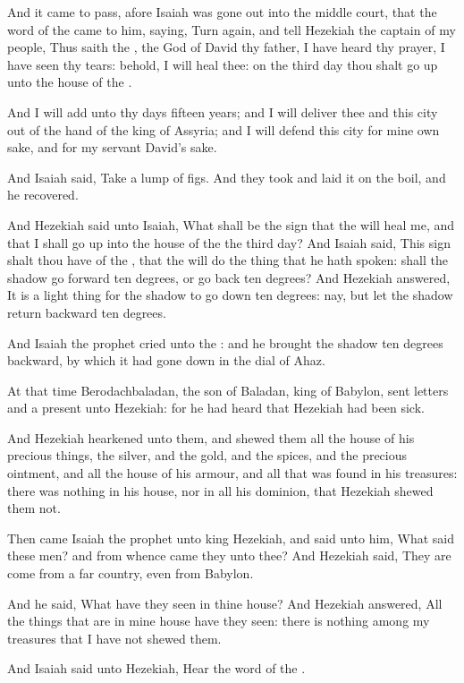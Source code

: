 \Verse And it came to pass, afore Isaiah was gone out into the middle court, that the word of the \LORD came to him, saying, \Verse Turn again, and tell Hezekiah the captain of my people, Thus saith the \LORD, the God of David thy father, I have heard thy prayer, I have seen thy tears: behold, I will heal thee: on the third day thou shalt go up unto the house of the \LORD.

\Verse And I will add unto thy days fifteen years; and I will deliver thee and this city out of the hand of the king of Assyria; and I will defend this city for mine own sake, and for my servant David's sake.

\Verse And Isaiah said, Take a lump of figs. And they took and laid it on the boil, and he recovered.

\Verse And Hezekiah said unto Isaiah, What shall be the sign that the \LORD will heal me, and that I shall go up into the house of the \LORD the third day?  \Verse And Isaiah said, This sign shalt thou have of the \LORD, that the \LORD will do the thing that he hath spoken: shall the shadow go forward ten degrees, or go back ten degrees?  \Verse And Hezekiah answered, It is a light thing for the shadow to go down ten degrees: nay, but let the shadow return backward ten degrees.

\Verse And Isaiah the prophet cried unto the \LORD: and he brought the shadow ten degrees backward, by which it had gone down in the dial of Ahaz.

\Verse At that time Berodachbaladan, the son of Baladan, king of Babylon, sent letters and a present unto Hezekiah: for he had heard that Hezekiah had been sick.

\Verse And Hezekiah hearkened unto them, and shewed them all the house of his precious things, the silver, and the gold, and the spices, and the precious ointment, and all the house of his armour, and all that was found in his treasures: there was nothing in his house, nor in all his dominion, that Hezekiah shewed them not.

\Verse Then came Isaiah the prophet unto king Hezekiah, and said unto him, What said these men? and from whence came they unto thee? And Hezekiah said, They are come from a far country, even from Babylon.

\Verse And he said, What have they seen in thine house? And Hezekiah answered, All the things that are in mine house have they seen: there is nothing among my treasures that I have not shewed them.

\Verse And Isaiah said unto Hezekiah, Hear the word of the \LORD.

